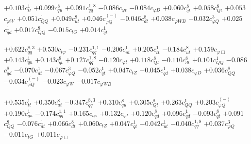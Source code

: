 \documentclass{article}
\begin{document}
{$+0.103$}{\rm $c_{tt}^{1}$} 
{$+0.099$}{\rm $c_{qu}^{8}$} 
{$+0.091$}{\rm $c_{qq}^{1,8}$} 
{$-0.086$}{\rm $c_{\varphi t}$} 
{$-0.084$}{\rm $c_{\varphi D}$} 
{$+0.060$}{\rm $c_{qt}^{8}$} 
{$+0.058$}{\rm $c_{Qt}^{8}$} 
{$+0.053$}{\rm $c_{\varphi W}$} 
{$+0.051$}{\rm $c_{QQ}^{1}$} 
{$+0.049$}{\rm $c_{ut}^{8}$} 
{$+0.046$}{\rm $c_{\varphi Q}^{(-)}$} 
{$-0.046$}{\rm $c_{dt}^{8}$} 
{$+0.038$}{\rm $c_{\varphi WB}$} 
{$-0.032$}{\rm $c_{\varphi Q}^{3}$} 
{$+0.025$}{\rm $c_{qd}^{1}$} 
{$+0.017$}{\rm $c_{QQ}^{8}$} 
{$-0.015$}{\rm $c_{tG}$} 
{$+0.014$}{\rm $c_{qt}^{1}$} 
 \nonumber \\ \nonumber \\ 
{$+0.622$}{\rm $c_{qq}^{8,3}$} 
{$+0.530$}{\rm $c_{t \varphi}$} 
{$-0.231$}{\rm $c_{qq}^{1,1}$} 
{$-0.206$}{\rm $c_{ut}^{1}$} 
{$+0.205$}{\rm $c_{tt}^{1}$} 
{$-0.184$}{\rm $c_{ut}^{8}$} 
{$+0.159$}{\rm $c_{\varphi \Box}$} 
{$+0.143$}{\rm $c_{qu}^{1}$} 
{$+0.143$}{\rm $c_{qt}^{8}$} 
{$+0.127$}{\rm $c_{qq}^{1,8}$} 
{$-0.120$}{\rm $c_{\varphi t}$} 
{$+0.118$}{\rm $c_{Qt}^{8}$} 
{$-0.110$}{\rm $c_{dt}^{8}$} 
{$+0.101$}{\rm $c_{QQ}^{1}$} 
{$-0.086$}{\rm $c_{qd}^{8}$} 
{$-0.070$}{\rm $c_{dt}^{1}$} 
{$-0.067$}{\rm $c_{\varphi Q}^{3}$} 
{$-0.052$}{\rm $c_{qt}^{1}$} 
{$+0.047$}{\rm $c_{tZ}$} 
{$-0.045$}{\rm $c_{qd}^{1}$} 
{$+0.038$}{\rm $c_{\varphi D}$} 
{$+0.036$}{\rm $c_{QQ}^{8}$} 
{$-0.034$}{\rm $c_{\varphi Q}^{(-)}$} 
{$-0.023$}{\rm $c_{\varphi W}$} 
{$-0.017$}{\rm $c_{\varphi WB}$} 
 \nonumber \\ \nonumber \\ 
{$+0.535$}{\rm $c_{tt}^{1}$} 
{$+0.350$}{\rm $c_{ut}^{8}$} 
{$-0.347$}{\rm $c_{qq}^{8,3}$} 
{$+0.310$}{\rm $c_{qu}^{8}$} 
{$+0.305$}{\rm $c_{Qt}^{8}$} 
{$+0.263$}{\rm $c_{QQ}^{1}$} 
{$+0.203$}{\rm $c_{\varphi Q}^{(-)}$} 
{$+0.190$}{\rm $c_{qu}^{1}$} 
{$-0.174$}{\rm $c_{qq}^{1,1}$} 
{$+0.165$}{\rm $c_{t \varphi}$} 
{$+0.132$}{\rm $c_{\varphi t}$} 
{$+0.120$}{\rm $c_{qd}^{8}$} 
{$+0.096$}{\rm $c_{qd}^{1}$} 
{$-0.093$}{\rm $c_{qt}^{8}$} 
{$+0.091$}{\rm $c_{QQ}^{8}$} 
{$-0.076$}{\rm $c_{dt}^{1}$} 
{$+0.066$}{\rm $c_{dt}^{8}$} 
{$+0.060$}{\rm $c_{tZ}$} 
{$+0.047$}{\rm $c_{qt}^{1}$} 
{$-0.042$}{\rm $c_{ut}^{1}$} 
{$-0.040$}{\rm $c_{qq}^{1,8}$} 
{$+0.037$}{\rm $c_{\varphi Q}^{3}$} 
{$-0.011$}{\rm $c_{tG}$} 
{$+0.011$}{\rm $c_{\varphi \Box}$} 
 \nonumber \\ \nonumber \\ 
\end{document}
